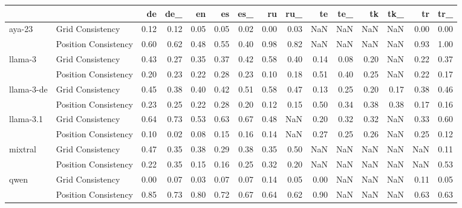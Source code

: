 \begin{tabular}{llrrrrrrrrrrrrr}
\toprule
 &  & de & de_ & en & es & es_ & ru & ru_ & te & te_ & tk & tk_ & tr & tr_ \\
\midrule
\multirow[t]{2}{*}{aya-23} & Grid Consistency & 0.12 & 0.12 & 0.05 & 0.05 & 0.02 & 0.00 & 0.03 & NaN & NaN & NaN & NaN & 0.00 & 0.00 \\
 & Position Consistency & 0.60 & 0.62 & 0.48 & 0.55 & 0.40 & 0.98 & 0.82 & NaN & NaN & NaN & NaN & 0.93 & 1.00 \\
\cline{1-15}
\multirow[t]{2}{*}{llama-3} & Grid Consistency & 0.43 & 0.27 & 0.35 & 0.37 & 0.42 & 0.58 & 0.40 & 0.14 & 0.08 & 0.20 & NaN & 0.22 & 0.37 \\
 & Position Consistency & 0.20 & 0.23 & 0.22 & 0.28 & 0.23 & 0.10 & 0.18 & 0.51 & 0.40 & 0.25 & NaN & 0.22 & 0.17 \\
\cline{1-15}
\multirow[t]{2}{*}{llama-3-de} & Grid Consistency & 0.45 & 0.38 & 0.40 & 0.42 & 0.51 & 0.58 & 0.47 & 0.13 & 0.25 & 0.20 & 0.17 & 0.38 & 0.46 \\
 & Position Consistency & 0.23 & 0.25 & 0.22 & 0.28 & 0.20 & 0.12 & 0.15 & 0.50 & 0.34 & 0.38 & 0.38 & 0.17 & 0.16 \\
\cline{1-15}
\multirow[t]{2}{*}{llama-3.1} & Grid Consistency & 0.64 & 0.73 & 0.53 & 0.63 & 0.67 & 0.48 & NaN & 0.20 & 0.32 & 0.32 & NaN & 0.33 & 0.60 \\
 & Position Consistency & 0.10 & 0.02 & 0.08 & 0.15 & 0.16 & 0.14 & NaN & 0.27 & 0.25 & 0.26 & NaN & 0.25 & 0.12 \\
\cline{1-15}
\multirow[t]{2}{*}{mixtral} & Grid Consistency & 0.47 & 0.35 & 0.38 & 0.29 & 0.38 & 0.35 & 0.50 & NaN & NaN & NaN & NaN & NaN & 0.11 \\
 & Position Consistency & 0.22 & 0.35 & 0.15 & 0.16 & 0.25 & 0.32 & 0.20 & NaN & NaN & NaN & NaN & NaN & 0.53 \\
\cline{1-15}
\multirow[t]{2}{*}{qwen} & Grid Consistency & 0.00 & 0.07 & 0.03 & 0.07 & 0.07 & 0.14 & 0.05 & 0.00 & NaN & NaN & NaN & 0.11 & 0.05 \\
 & Position Consistency & 0.85 & 0.73 & 0.80 & 0.72 & 0.67 & 0.64 & 0.62 & 0.90 & NaN & NaN & NaN & 0.63 & 0.63 \\
\cline{1-15}
\bottomrule
\end{tabular}
